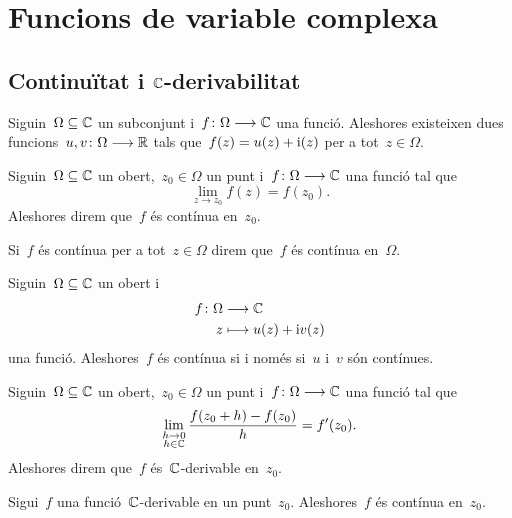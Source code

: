 \documentclass[../Apunts.tex]{subfiles}
\begin{document}
\section{Funcions de variable complexa}
	\subsection{Continuïtat i \ensuremath{\CC}-derivabilitat}
	\begin{observation}
		Siguin~\(\Omega\subseteq\mathbb{C}\) un subconjunt i~\(f\colon\Omega\longrightarrow\mathbb{C}\) una funció. Aleshores existeixen dues funcions~\(u,v\colon\Omega\longrightarrow\mathbb{R}\) tals que~\(f(z)=u(z)+\mathrm{i}(z)\) per a tot~\(z\in\Omega\).
	\end{observation}
	\begin{definition}[Continuïtat]
		\label{def:funció complexa contínua}
		Siguin~\(\Omega\subseteq\mathbb{C}\) un obert,~\(z_{0}\in\Omega\) un punt i~\(f\colon\Omega\longrightarrow\mathbb{C}\) una funció tal que
		\[\lim_{z\to z_{0}}f(z)=f(z_{0}).\]
		Aleshores direm que~\(f\) és contínua en~\(z_{0}\).
		
		Si~\(f\) és contínua per a tot~\(z\in\Omega\) direm que~\(f\) és contínua en~\(\Omega\).
	\end{definition}
	\begin{observation}
		\label{obs:una funció complexa és contínua si i només si ho són les seves components}
		Siguin~\(\Omega\subseteq\mathbb{C}\) un obert i
		\begin{align*}
			f\colon\Omega&\longrightarrow\mathbb{C} \\
			z&\longmapsto u(z)+\mathrm{i} v(z)
		\end{align*}
		una funció. Aleshores~\(f\) és contínua si i només si~\(u\) i~\(v\) són contínues.
	\end{observation}
	\begin{definition}
		\label{def:C-derivable}\label{def:funció C-derivable}
		Siguin~\(\Omega\subseteq\mathbb{C}\) un obert,~\(z_{0}\in\Omega\) un punt i~\(f\colon\Omega\longrightarrow\mathbb{C}\) una funció tal que
		\[\lim_{\substack{h\to0\\ h\in\mathbb{C}}}\frac{f(z_{0}+h)-f(z_{0})}{h}=f'(z_{0}).\]
		Aleshores direm que~\(f\) és~\(\mathbb{C}\)-derivable en~\(z_{0}\).
	\end{definition}
	\begin{observation}
		\label{obs:C-derivable implica contínua}
		Sigui~\(f\) una funció~\(\mathbb{C}\)-derivable en un punt~\(z_{0}\). Aleshores~\(f\) és contínua en~\(z_{0}\).
	\end{observation}
\end{document}
